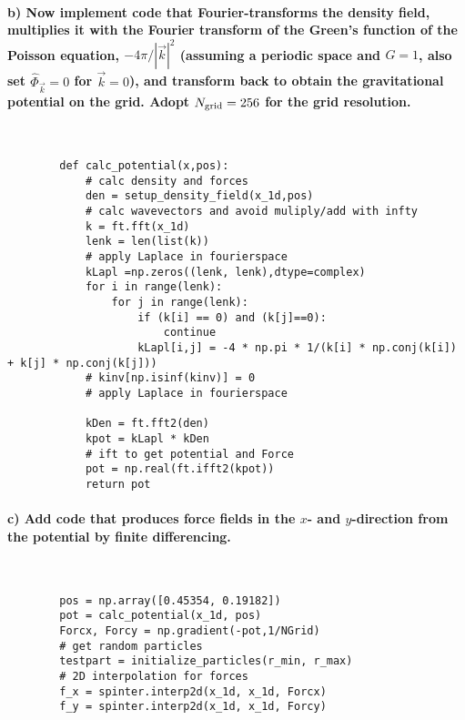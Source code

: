 \paragraph{b) Now implement code that Fourier-transforms the density field, 
    multiplies it with the Fourier transform of the Green's function of the 
    Poisson equation, $-4\pi/|\vec k|^2$ (assuming a periodic space and 
    $G=1$, also set $\hat{\Phi}_{\vec k}=0$ for $\vec k=0$), and transform back 
    to obtain the gravitational potential on the grid. Adopt 
    $N_\textnormal{grid}=256$ for the grid resolution.
} \ \\
    \begin{lstlisting}
        def calc_potential(x,pos):
            # calc density and forces
            den = setup_density_field(x_1d,pos)
            # calc wavevectors and avoid muliply/add with infty
            k = ft.fft(x_1d)
            lenk = len(list(k))
            # apply Laplace in fourierspace
            kLapl =np.zeros((lenk, lenk),dtype=complex)
            for i in range(lenk):
                for j in range(lenk):
                    if (k[i] == 0) and (k[j]==0):
                        continue
                    kLapl[i,j] = -4 * np.pi * 1/(k[i] * np.conj(k[i]) + k[j] * np.conj(k[j]))
            # kinv[np.isinf(kinv)] = 0
            # apply Laplace in fourierspace
        
            kDen = ft.fft2(den)
            kpot = kLapl * kDen
            # ift to get potential and Force
            pot = np.real(ft.ifft2(kpot))
            return pot\end{lstlisting}


\paragraph{c) Add code that produces force fields in the $x$- and 
    $y$-direction from the potential by finite differencing.
} \ \\
    \begin{lstlisting}
        pos = np.array([0.45354, 0.19182])
        pot = calc_potential(x_1d, pos)
        Forcx, Forcy = np.gradient(-pot,1/NGrid)
        # get random particles
        testpart = initialize_particles(r_min, r_max)
        # 2D interpolation for forces
        f_x = spinter.interp2d(x_1d, x_1d, Forcx)
        f_y = spinter.interp2d(x_1d, x_1d, Forcy)\end{lstlisting}


